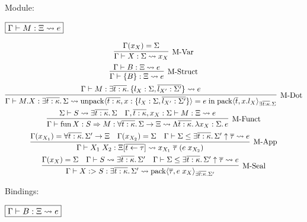 Module:

$\fbox{$\Gamma \vdash M: \Xi \rightsquigarrow e$}$

\begin{gather*}
  \infer[\text{M-Var}]{\Gamma \vdash X: \Sigma \elaborate x_X}{
    \Gamma(x_X) = \Sigma
  }
  \\
  \infer[\text{M-Struct}]{\Gamma \vdash \{B\}: \Xi \elaborate e}{
    \Gamma \vdash B: \Xi \elaborate e
  }
  \\
  \infer[\text{M-Dot}]{\Gamma \vdash M.X: \exists \overline{t: \kappa}\ldotp \Sigma \elaborate \symunpack\langle \overline{t: \kappa}, x: \{l_X: \Sigma, \overline{l_{X'}: \Sigma'}\}\rangle = e \symin \sympack\langle \overline{t}, x.l_X\rangle_{\exists \overline{t: \kappa}\ldotp \Sigma}}{
    \Gamma \vdash M: \exists \overline{t: \kappa}\ldotp \{l_X: \Sigma, \overline{l_{X'}: \Sigma'}\} \elaborate e
  }
  \\
  \infer[\text{M-Funct}]{\Gamma \vdash \symfun X: S \Rightarrow M: \forall \overline{t: \kappa}\ldotp \Sigma \to \Xi \elaborate \Lambda \overline{t: \kappa}\ldotp \lambda x_X: \Sigma\ldotp e}{
    \Sigma \vdash S \elaborate \exists \overline{t: \kappa}\ldotp \Sigma
    &
    \Gamma, \overline{t: \kappa}, x_X: \Sigma \vdash M: \Xi \elaborate e
  }
  \\
  \infer[\text{M-App}]{\Gamma \vdash X_1\; X_2: \Xi[\overline{t \assign \tau}] \elaborate x_{X_1}\; \overline{\tau}\; (e\; x_{X_2})}{
    \Gamma(x_{X_1}) = \forall \overline{t: \kappa}\ldotp \Sigma' \to \Xi
    &
    \Gamma(x_{X_2}) = \Sigma
    &
    \Gamma \vdash \Sigma \leq \exists\overline{t: \kappa}\ldotp \Sigma' \uparrow \overline{\tau} \elaborate e
  }
  \\
  \infer[\text{M-Seal}]{\Gamma \vdash X :> S: \exists \overline{t: \kappa}\ldotp \Sigma' \elaborate \sympack\langle \overline{\tau}, e\; x_X\rangle_{\exists \overline{t: \kappa}\ldotp \Sigma'}}{
    \Gamma(x_X) = \Sigma
    &
    \Gamma \vdash S \elaborate \exists \overline{t: \kappa}\ldotp \Sigma'
    &
    \Gamma \vdash \Sigma \leq \exists \overline{t: \kappa}\ldotp \Sigma' \uparrow \overline{\tau} \elaborate e
  }
\end{gather*}

Bindings:

$\fbox{$\Gamma \vdash B: \Xi \rightsquigarrow e$}$

